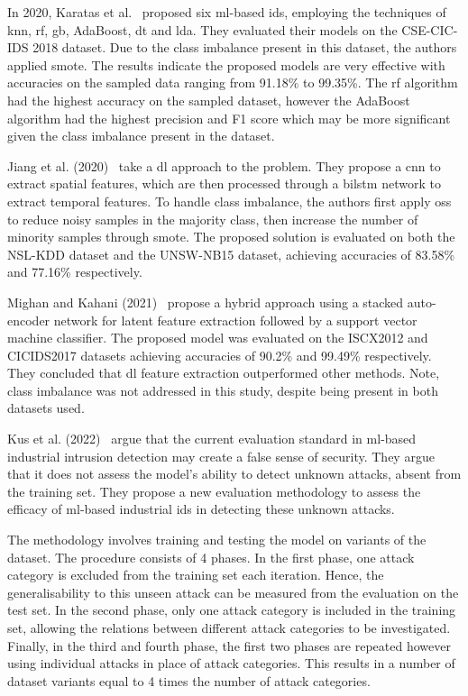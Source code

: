 In 2020, Karatas et al.~\cite{Karatas} proposed six \gls{ml}-based \gls{ids},
employing the techniques of \gls{knn}, \gls{rf}, \gls{gb}, AdaBoost, \gls{dt}
and \gls{lda}. They evaluated their models on the CSE-CIC-IDS 2018 dataset. Due
to the class imbalance present in this dataset, the authors applied
\gls{smote}. The results indicate the proposed models are very effective with
accuracies on the sampled data ranging from 91.18\% to 99.35\%. The \gls{rf}
algorithm had the highest accuracy on the sampled dataset, however the AdaBoost
algorithm had the highest precision and F1 score which may be more significant
given the class imbalance present in the dataset.

Jiang et al. (2020)~\cite{Jiang} take a \gls{dl} approach to the problem. They
propose a \gls{cnn} to extract spatial features, which are then processed
through a \gls{bilstm} network to extract temporal features. To handle class
imbalance, the authors first apply \gls{oss} to reduce noisy samples in the
majority class, then increase the number of minority samples through
\gls{smote}. The proposed solution is evaluated on both the NSL-KDD dataset and
the UNSW-NB15 dataset, achieving accuracies of 83.58\% and 77.16\%
respectively.

Mighan and Kahani (2021)~\cite{Mighan} propose a hybrid approach using a
stacked auto-encoder network for latent feature extraction followed by a
support vector machine classifier. The proposed model was evaluated on the
ISCX2012 and CICIDS2017 datasets achieving accuracies of 90.2\% and 99.49\%
respectively. They concluded that \gls{dl} feature extraction outperformed
other methods. Note, class imbalance was not addressed in this study, despite
being present in both datasets used.

Kus et al. (2022)~\cite{Kus} argue that the current evaluation standard in
\gls{ml}-based industrial intrusion detection may create a false sense of
security. They argue that it does not assess the model's ability to detect
unknown attacks, absent from the training set. They propose a new evaluation
methodology to assess the efficacy of \gls{ml}-based industrial \gls{ids} in
detecting these unknown attacks.

The methodology involves training and testing the model on variants of the
dataset. The procedure consists of 4 phases. In the first phase, one attack
category is excluded from the training set each iteration. Hence, the
generalisability to this unseen attack can be measured from the evaluation on
the test set. In the second phase, only one attack category is included in the
training set, allowing the relations between different attack categories to be
investigated. Finally, in the third and fourth phase, the first two phases are
repeated however using individual attacks in place of attack categories. This
results in a number of dataset variants equal to 4 times the number of attack
categories.


